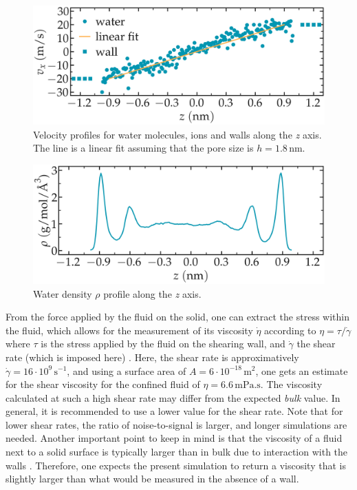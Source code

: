 \documentclass[9pt,tutorial]{livecoms}
\begin{document}
\begin{figure}
\centering
\includegraphics[width=\linewidth]{NANOSHEAR-velocity}
\caption{Velocity profiles for water molecules, ions and walls along the \textit{z} axis. The line is a linear fit assuming that the pore size is $h = 1.8\,\text{nm}$.}
\label{fig:NANOSHEAR-velocity}
\end{figure}

\begin{figure}
\centering
\includegraphics[width=\linewidth]{NANOSHEAR-density}
\caption{Water density $\rho$ profile along the \textit{z} axis.}
\label{fig:NANOSHEAR-density}
\end{figure}

From the force applied by the fluid on the solid, one can extract the stress within the fluid, which allows for the measurement of its viscosity $\dot{\eta}$ according to $\eta = \tau / \dot{\gamma}$ where $\tau$ is the stress applied by the fluid on the shearing wall, and $\dot{\gamma}$ the shear rate (which is imposed here) \cite{gravelle2021violations}. Here, the shear rate is approximatively $\dot{\gamma} = 16 \cdot 10^9\,\text{s}^{-1}$, and using a surface area of $A = 6 \cdot 10^{-18}\,\text{m}^2$, one gets an estimate for the shear viscosity for the confined fluid of $\eta = 6.6\,\text{mPa.s}$. The viscosity calculated at such a high shear rate may differ from the expected \textit{bulk} value. In general, it is recommended to use a lower value for the shear rate. Note that for lower shear rates, the ratio of noise-to-signal is larger, and longer simulations are needed. Another important point to keep in mind is that the viscosity of a fluid next to a solid surface is typically larger than in bulk due to interaction with the walls \cite{wolde-kidanInterplayInterfacialViscosity2021}. Therefore, one expects the present simulation to return a viscosity that is slightly larger than what would be measured in the absence of a wall.
\end{document}
